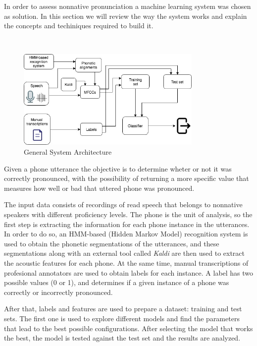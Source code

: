 In order to assess nonnative pronunciation a machine learning system was chosen as solution.
In this section we will review the way the system works and explain the concepts 
and techiniques required to build it.

~

\begin{figure}[H]
	\centering
	\includegraphics[width=0.8\textwidth]{files/figures/method/general-structure.jpg}
	\caption{General System Architecture}
	\label{fig:methodGeneralArchitecture}
\end{figure}

Given a phone utterance the objective is to determine wheter or not it was correctly
pronounced, with the possibility of returning
a more specific value that measures how well or bad that uttered phone
was pronounced.

The input data consists of recordings of read
speech that belongs to nonnative speakers with different proficiency levels.
The phone is the unit of analysis, so the first step is extracting the information
for each phone instance in the utterances.  In order to do so,
an HMM-based (Hidden Markov Model) recognition system is used to obtain the phonetic
segmentations of the utterances, and these segmentations along with an external tool
called \emph{Kaldi} are then used to extract the 
acoustic features for each phone. At the same time, manual transcriptions of profesional
annotators are used to obtain labels for each instance. A label has two possible values (0 or 1),
and determines if a given instance of a phone was correctly or incorrectly pronounced.

After that, labels and features are used to prepare a dataset: training and test sets. The first
one is used to explore different models and find the parameters that lead to the
best possible configurations. 
After selecting the model that works the best, the model is tested against the test set 
and the results are analyzed.

